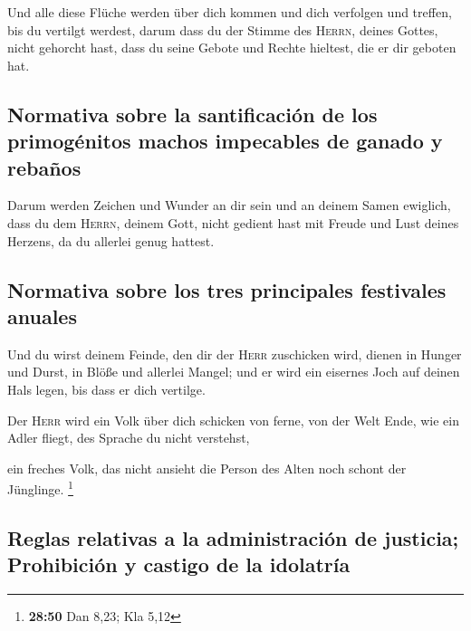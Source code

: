  Und alle diese Flüche werden über dich kommen und dich
verfolgen und treffen, bis du vertilgt werdest, darum dass du der Stimme
des \textsc{Herrn}, deines Gottes, nicht gehorcht hast, dass du seine
Gebote und Rechte hieltest, die er dir geboten hat.

\hypertarget{normativa-sobre-la-santificaciuxf3n-de-los-primoguxe9nitos-machos-impecables-de-ganado-y-rebauxf1os}{%
\subsection{Normativa sobre la santificación de los primogénitos machos
impecables de ganado y
rebaños}\label{normativa-sobre-la-santificaciuxf3n-de-los-primoguxe9nitos-machos-impecables-de-ganado-y-rebauxf1os}}

 Darum werden Zeichen und Wunder an dir sein und an
deinem Samen ewiglich,  dass du dem \textsc{Herrn},
deinem Gott, nicht gedient hast mit Freude und Lust deines Herzens, da
du allerlei genug hattest.

\hypertarget{normativa-sobre-los-tres-principales-festivales-anuales}{%
\subsection{Normativa sobre los tres principales festivales
anuales}\label{normativa-sobre-los-tres-principales-festivales-anuales}}

 Und du wirst deinem Feinde, den dir der \textsc{Herr}
zuschicken wird, dienen in Hunger und Durst, in Blöße und allerlei
Mangel; und er wird ein eisernes Joch auf deinen Hals legen, bis dass er
dich vertilge.

 Der \textsc{Herr} wird ein Volk über dich schicken von
ferne, von der Welt Ende, wie ein Adler fliegt, des Sprache du nicht
verstehst,

 ein freches Volk, das nicht ansieht die Person des Alten
noch schont der Jünglinge. \footnote{\textbf{28:50} Dan 8,23; Kla 5,12}

\hypertarget{reglas-relativas-a-la-administraciuxf3n-de-justicia-prohibiciuxf3n-y-castigo-de-la-idolatruxeda}{%
\subsection{Reglas relativas a la administración de justicia;
Prohibición y castigo de la
idolatría}\label{reglas-relativas-a-la-administraciuxf3n-de-justicia-prohibiciuxf3n-y-castigo-de-la-idolatruxeda}}

